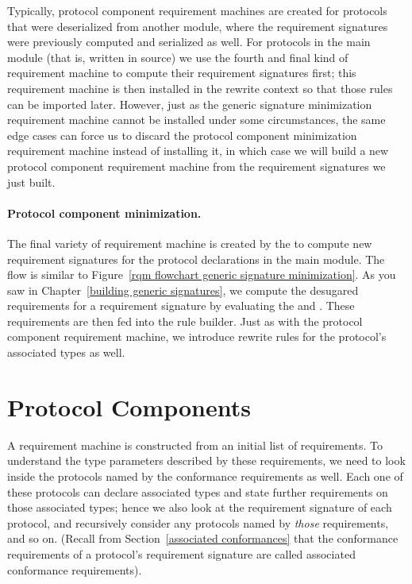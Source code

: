 \documentclass[../generics]{subfiles}
\begin{document}
%
%
%
Typically, protocol component requirement machines are created for protocols that were deserialized from another module, where the requirement signatures were previously computed and serialized as well. For protocols in the main module (that is, written in source) we use the fourth and final kind of requirement machine to compute their requirement signatures first; this requirement machine is then installed in the rewrite context so that those rules can be imported later. However, just as the generic signature minimization requirement machine cannot be installed under some circumstances, the same edge cases can force us to discard the protocol component minimization requirement machine instead of installing it, in which case we will build a new protocol component requirement machine from the requirement signatures we just built.

\paragraph{Protocol component minimization.}
%
%
%
%
The final variety of requirement machine is created by the  to compute new requirement signatures for the protocol declarations in the main module. The flow is similar to Figure~\ref{rqm flowchart generic signature minimization}. As you saw in Chapter~\ref{building generic signatures}, we compute the desugared requirements for a requirement signature by evaluating the  and . These requirements are then fed into the rule builder. Just as with the protocol component requirement machine, we introduce rewrite rules for the protocol's associated types as well.

\section{Protocol Components}\label{protocol component}

%
%
%
A requirement machine is constructed from an initial list of requirements. To understand the type parameters described by these requirements, we need to look inside the protocols named by the conformance requirements as well. Each one of these protocols can declare associated types and state further requirements on those associated types; hence we also look at the requirement signature of each protocol, and recursively consider any protocols named by \emph{those} requirements, and so on. (Recall from Section~\ref{associated conformances} that the conformance requirements of a protocol's requirement signature are called associated conformance requirements).
\end{document}

